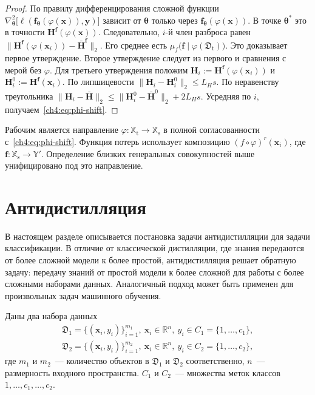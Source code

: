 \begin{proof}
По правилу дифференцирования сложной функции $\nabla^2_{\boldsymbol{\theta}}\bigl[\ell(\mathbf{f}_{\boldsymbol{\theta}}(\varphi(\mathbf{x})),\mathbf{y})\bigr]$ зависит от $\boldsymbol{\theta}$ только через $\mathbf{f}_{\boldsymbol{\theta}}(\varphi(\mathbf{x}))$.
В точке $\boldsymbol{\theta}^*$ это в точности $\mathbf{H}^{\mathbf{f}}(\varphi(\mathbf{x}))$.
Следовательно, $i$-й член разброса равен $\bigl\|\mathbf{H}^{\mathbf{f}}(\varphi(\mathbf{x}_i))-\bar{\mathbf{H}}^{\mathbf{f}}\bigr\|_2$.
Его среднее есть $\mu_f\bigl(\mathbf{f}\mid\varphi(\mathfrak{D}_{\text{t}})\bigr)$.
Это доказывает первое утверждение.
Второе утверждение следует из первого и сравнения с мерой без $\varphi$.
Для третьего утверждения положим $\mathbf{H}_i:=\mathbf{H}^{\mathbf{f}}(\varphi(\mathbf{x}_i))$ и $\mathbf{H}_i^{0}:=\mathbf{H}^{\mathbf{f}}(\mathbf{x}_i)$.
По липшицевости $\bigl\|\mathbf{H}_i-\mathbf{H}_i^{0}\bigr\|_2\le L_H s$.
По неравенству треугольника $\bigl\|\mathbf{H}_i-\bar{\mathbf{H}}\bigr\|_2\le\bigl\|\mathbf{H}_i^{0}-\bar{\mathbf{H}}^{0}\bigr\|_2+2L_Hs$.
Усредняя по $i$, получаем~\eqref{ch4:eq:phi-shift}. \end{proof}

\begin{remark}\label{ch4:rem:phi-direction}
Рабочим является направление $\varphi:\mathbb{X}_{\text{t}}\to\mathbb{X}_{\text{s}}$ в полной согласованности с~\eqref{ch4:eq:phi-shift}.
Функция потерь использует композицию $(f\circ\varphi)^r(\mathbf{x}_i)$, где $\mathbf{f}:\mathbb{X}_{\text{s}}\to\mathbb{Y}'$.
Определение близких генеральных совокупностей выше унифицировано под это направление.
\end{remark}

\section{Антидистилляция}

В настоящем разделе описывается постановка задачи антидистилляции для задачи классификации. В отличие от классической дистилляции, где знания передаются от более сложной модели к более простой, антидистилляция решает обратную задачу: передачу знаний от простой модели к более сложной для работы с более сложными наборами данных. Аналогичный подход может быть применен для произвольных задач машинного обучения.

Даны два набора данных
\begin{align}
    \mathfrak{D}_1 = \{(\mathbf{x}_i, y_i)\}_{i=1}^{m_1},~\mathbf{x}_i \in \mathbb{R}^{n},~y_i \in C_1 = \{1, \dots, c_1\}, \\
    \mathfrak{D}_2 =  \{(\mathbf{x}_i, y_i)\}_{i=1}^{m_2},~\mathbf{x}_i \in \mathbb{R}^{n},~y_i \in C_2 = \{1, \dots, c_2\},
\end{align}
где $m_1$ и $m_2$~--- количество объектов в $\mathfrak{D}_1$ и $\mathfrak{D}_2$ соответственно, $n$~--- размерность входного пространства. $C_1$ и $C_2$~--- множества меток классов $1, \dots, c_1, \dots, c_2$.

